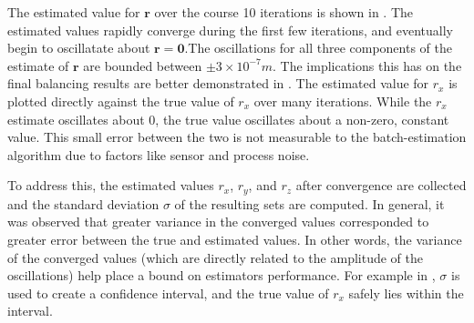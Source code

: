 The estimated value for $\bm{r}$ over the course 10 iterations is shown in . The estimated values rapidly converge during the first few iterations, and eventually begin to oscillatate about $\bm{r}=\bm{0}$.The oscillations for all three components of the estimate of $\bm{r}$ are bounded between $\pm3\times10^{-7}m$. The implications this has on the final balancing results are better demonstrated in . The estimated value for $r_x$ is plotted directly against the true value of $r_x$ over many iterations. While the $r_x$ estimate oscillates about 0, the true value oscillates about a non-zero, constant value. This small error between the two is not measurable to the batch-estimation algorithm due to factors like sensor and process noise. 

To address this, the estimated values $r_x$, $r_y$, and $r_z$ after convergence are collected and the standard deviation $\sigma$ of the resulting sets are computed. In general, it was observed that greater variance in the converged values corresponded to greater error between the true and estimated values. In other words, the variance of the converged values (which are directly related to the amplitude of the oscillations) help place a bound on estimators performance. For example in , $\sigma$ is used to create a confidence interval, and the true value of $r_x$ safely lies within the interval.


